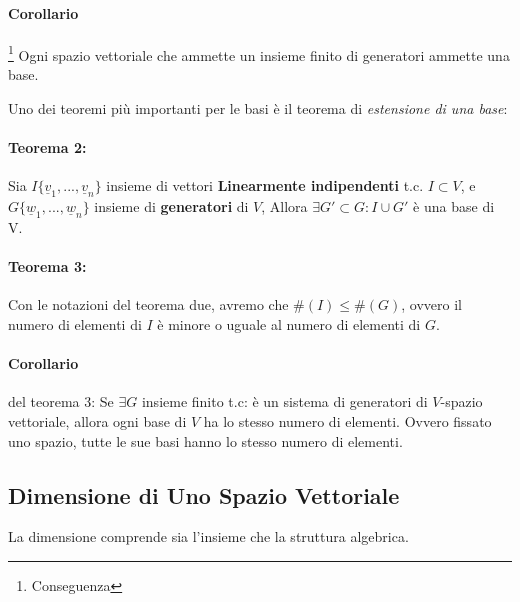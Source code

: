 \paragraph{Corollario}\footnote{Conseguenza} Ogni spazio vettoriale che ammette un insieme finito di generatori ammette una base.


Uno dei teoremi più importanti per le basi è il teorema di \emph{estensione di una base}:
\paragraph{Teorema 2:}
Sia $I\{\underline{v}_1,...,\underline{v}_n\}$ insieme di vettori \textbf{Linearmente indipendenti} t.c. $I\subset V$,
e $G\{\underline{w}_1,...,\underline{w}_n\}$ insieme di \textbf{generatori} di $V$,
Allora $\exists G' \subset G : I \cup G'$ è una base di V.

\paragraph{Teorema 3:} Con le notazioni del teorema due, avremo che $\#(I) \leq \#(G)$, ovvero il numero di elementi di $I$ è minore o uguale al numero di elementi di $G$.

\paragraph{Corollario} del teorema 3:
Se $\exists G$ insieme finito t.c: è un sistema di generatori di $V$-spazio vettoriale, allora ogni base di $V$ ha lo stesso numero di elementi.
Ovvero fissato uno spazio, tutte le sue basi hanno lo stesso numero di elementi.


\subsection{Dimensione di Uno Spazio Vettoriale}
La dimensione comprende sia l'insieme che la struttura algebrica.

